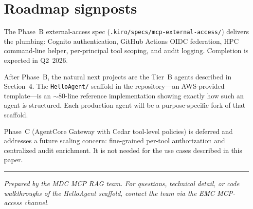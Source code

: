 \documentclass[11pt,letterpaper]{article}
\begin{document}
\section{Roadmap signposts}

The Phase~B external-access spec (\texttt{.kiro/specs/mcp-external-access/})
delivers the plumbing: Cognito authentication, GitHub Actions OIDC
federation, HPC command-line helper, per-principal tool scoping, and
audit logging. Completion is expected in Q2~2026.

After Phase~B, the natural next projects are the Tier~B agents described
in Section~4. The \texttt{HelloAgent/} scaffold in the repository---an
AWS-provided template---is an $\sim$80-line reference implementation
showing exactly how such an agent is structured. Each production agent
will be a purpose-specific fork of that scaffold.

Phase~C (AgentCore Gateway with Cedar tool-level policies) is deferred
and addresses a future scaling concern: fine-grained per-tool
authorization and centralized audit enrichment. It is not needed for
the use cases described in this paper.

\vspace{8pt}
\hrule
\vspace{8pt}
\footnotesize
\textit{Prepared by the MDC MCP RAG team. For questions, technical
detail, or code walkthroughs of the HelloAgent scaffold, contact the
team via the EMC MCP-access channel.}
\end{document}
